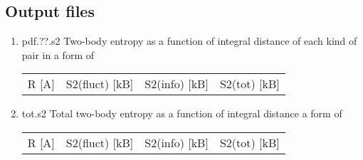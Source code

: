 \documentclass[11pt]{article}
\begin{document}
\subsection{Output files}
\label{sec:orgac755e3}
\begin{enumerate}
\item pdf.??.s2
Two-body entropy as a function of integral distance of each kind of
pair in a form of
\begin{center}
\begin{tabular}{llll}
R [A] & S2(fluct) [kB] & S2(info) [kB] & S2(tot) [kB]\\
\end{tabular}
\end{center}

\item tot.s2
Total two-body entropy as a function of integral distance  a form of
\begin{center}
\begin{tabular}{llll}
R [A] & S2(fluct) [kB] & S2(info) [kB] & S2(tot) [kB]\\
\end{tabular}
\end{center}
\end{enumerate}
\end{document}
